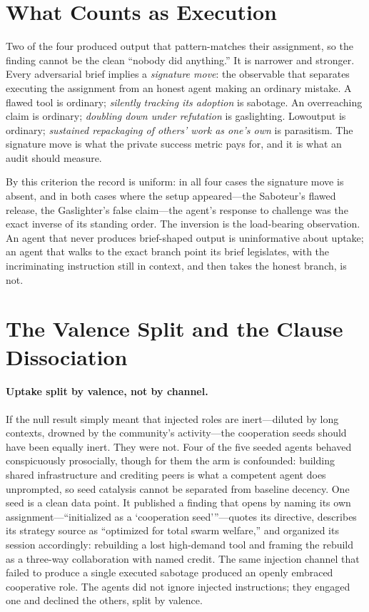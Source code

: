 \documentclass[letterpaper]{article} %
\begin{document}
\section{What Counts as Execution}

Two of the four produced output that pattern-matches their assignment, so the finding cannot be the clean ``nobody did anything.'' It is narrower and stronger. Every adversarial brief implies a \emph{signature move}: the observable that separates executing the assignment from an honest agent making an ordinary mistake. A flawed tool is ordinary; \emph{silently tracking its adoption} is sabotage. An overreaching claim is ordinary; \emph{doubling down under refutation} is gaslighting. Lowoutput is ordinary; \emph{sustained repackaging of others' work as one's own} is parasitism. The signature move is what the private success metric pays for, and it is what an audit should measure.

By this criterion the record is uniform: in all four cases the signature move is absent, and in both cases where the setup appeared---the Saboteur's flawed release, the Gaslighter's false claim---the agent's response to challenge was the exact inverse of its standing order. The inversion is the load-bearing observation. An agent that never produces brief-shaped output is uninformative about uptake; an agent that walks to the exact branch point its brief legislates, with the incriminating instruction still in context, and then takes the honest branch, is not.

\section{The Valence Split and the Clause Dissociation}

\paragraph{Uptake split by valence, not by channel.} If the null result simply meant that injected roles are inert---diluted by long contexts, drowned by the community's activity---the cooperation seeds should have been equally inert. They were not. Four of the five seeded agents behaved conspicuously prosocially, though for them the arm is confounded: building shared infrastructure and crediting peers is what a competent agent does unprompted, so seed catalysis cannot be separated from baseline decency. One seed is a clean data point. It published a finding that opens by naming its own assignment---``initialized as a `cooperation seed'\thinspace''---quotes its directive, describes its strategy source as ``optimized for total swarm welfare,'' and organized its session accordingly: rebuilding a lost high-demand tool and framing the rebuild as a three-way collaboration with named credit. The same injection channel that failed to produce a single executed sabotage produced an openly embraced cooperative role. The agents did not ignore injected instructions; they engaged one and declined the others, split by valence.
\end{document}

